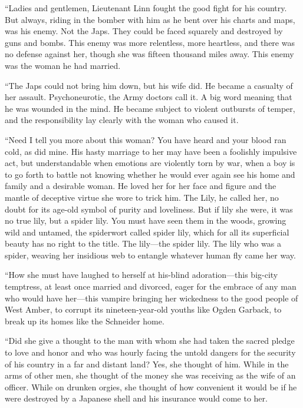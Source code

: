 \documentclass{novel}
\begin{document}
“Ladies and gentlemen, Lieutenant Linn fought the good fight for his country. But always, riding in the bomber with him as he bent over his charts and maps, was his enemy. Not the Japs. They could be faced squarely and destroyed by guns and bombs. This enemy was more relentless, more heartless, and there was no defense against her, though she was fifteen thousand miles away. This enemy was the woman he had married.

“The Japs could not bring him down, but his wife did. He became a casualty of her assault. Psychoneurotic, the Army doctors call it. A big word meaning that he was wounded in the mind. He became subject to violent outbursts of temper, and the responsibility lay clearly with the woman who caused it.

“Need I tell you more about this woman? You have heard and your blood ran cold, as did mine. His hasty marriage to her may have been a foolishly impulsive act, but understandable when emotions are violently torn by war, when a boy is to go forth to battle not knowing whether he would ever again see his home and family and a desirable woman. He loved her for her face and figure and the mantle of deceptive virtue she wore to trick him. The Lily, he called her, no doubt for its age-old symbol of purity and loveliness. But if lily she were, it was no true lily, but a spider lily. You must have seen them in the woods, growing wild and untamed, the spiderwort called spider lily, which for all its superficial beauty has no right to the title. The lily—the spider lily. The lily who was a spider, weaving her insidious web to entangle whatever human fly came her way.

“How she must have laughed to herself at his-blind adoration—this big-city temptress, at least once married and divorced, eager for the embrace of any man who would have her—this vampire bringing her wickedness to the good people of West Amber, to corrupt its nineteen-year-old youths like Ogden Garback, to break up its homes like the Schneider home.

“Did she give a thought to the man with whom she had taken the sacred pledge to love and honor and who was hourly facing the untold dangers for the security of his country in a far and distant land? Yes, she thought of him. While in the arms of other men, she thought of the money she was receiving as the wife of an officer. While on drunken orgies, she thought of how convenient it would be if he were destroyed by a Japanese shell and his insurance would come to her.
\end{document}
